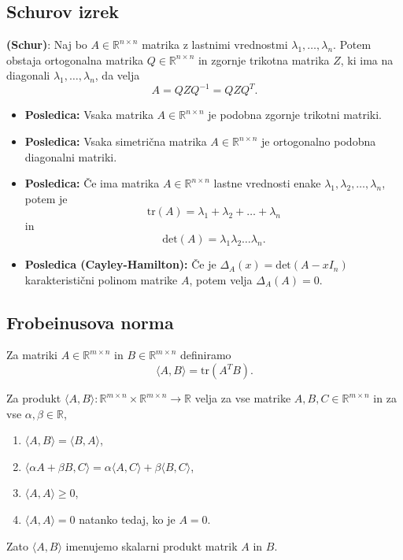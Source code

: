 \documentclass{article}
\begin{document}
\begin{multicols}{2}
\subsection{Schurov izrek}

\textbf{(Schur)}: Naj bo \( A \in \mathbb{R}^{n \times n} \) matrika z lastnimi vrednostmi \( \lambda_1, \ldots, \lambda_n \). Potem obstaja ortogonalna matrika \( Q \in \mathbb{R}^{n \times n} \) in zgornje trikotna matrika \( Z \), ki ima na diagonali \( \lambda_1, \ldots, \lambda_n \), da velja
\[ A = QZQ^{-1} = QZQ^T. \]

\begin{itemize}
    \item \textbf{Posledica:} Vsaka matrika \( A \in \mathbb{R}^{n \times n} \) je podobna zgornje trikotni matriki.
    
    \item \textbf{Posledica:} Vsaka simetrična matrika \( A \in \mathbb{R}^{n \times n} \) je ortogonalno podobna diagonalni matriki.
    
    \item \textbf{Posledica:} Če ima matrika \( A \in \mathbb{R}^{n \times n} \) lastne vrednosti enake \( \lambda_1, \lambda_2, \ldots, \lambda_n \), potem je
    \[
    \text{tr}(A) = \lambda_1 + \lambda_2 + \ldots + \lambda_n
    \]
    in
    \[
    \text{det}(A) = \lambda_1 \lambda_2 \ldots \lambda_n.
    \]
    
    \item \textbf{Posledica (Cayley-Hamilton):} Če je \( \Delta_A(x) = \text{det}(A - xI_n) \) karakteristični polinom matrike \( A \), potem velja \( \Delta_A(A) = 0 \).
\end{itemize}

\subsection{Frobeinusova norma}

Za matriki \( A \in \mathbb{R}^{m \times n} \) in \( B \in \mathbb{R}^{m \times n} \) definiramo
\[
\langle A, B \rangle = \text{tr}(A^T B).
\]

Za produkt \( \langle A, B \rangle: \mathbb{R}^{m \times n} \times \mathbb{R}^{m \times n} \rightarrow \mathbb{R} \) velja za vse matrike \( A, B, C \in \mathbb{R}^{m \times n} \) in za vse \( \alpha, \beta \in \mathbb{R} \),
\begin{enumerate}
    \item \( \langle A, B \rangle = \langle B, A \rangle \),
    \item \( \langle \alpha A + \beta B, C \rangle = \alpha \langle A, C \rangle + \beta \langle B, C \rangle \),
    \item \( \langle A, A \rangle \geq 0 \),
    \item \( \langle A, A \rangle = 0 \) natanko tedaj, ko je \( A = 0 \).
\end{enumerate}
Zato \( \langle A, B \rangle \) imenujemo skalarni produkt matrik \( A \) in \( B \).


\end{multicols}
\end{document}
